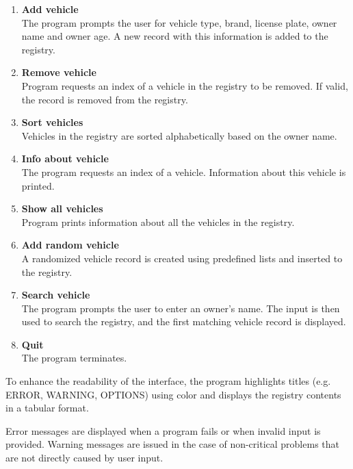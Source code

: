 \documentclass[12pt, a4paper]{article}
\begin{document}
\begin{enumerate}
  \item \textbf{Add vehicle} \\
  The program prompts the user for vehicle type, brand, license plate, owner name and owner age. A new record with this information is added to the registry.

  \item \textbf{Remove vehicle} \\
  Program requests an index of a vehicle in the registry to be removed. If valid, the record is removed from the registry.

  \item \textbf{Sort vehicles} \\
  Vehicles in the registry are sorted alphabetically based on the owner name.

  \item \textbf{Info about vehicle} \\
  The program requests an index of a vehicle. Information about this vehicle is printed.

  \item \textbf{Show all vehicles} \\
  Program prints information about all the vehicles in the registry.

  \item \textbf{Add random vehicle} \\
  A randomized vehicle record is created using predefined lists and inserted to the registry.

  \item \textbf{Search vehicle} \\
    The program prompts the user to enter an owner's name. The input is then used to search the registry, and the first matching vehicle record is displayed.

  \item \textbf{Quit} \\
  The program terminates.
\end{enumerate}

To enhance the readability of the interface, the program highlights titles (e.g. ERROR, WARNING, OPTIONS) using color and displays the registry contents in a tabular format. 

Error messages are displayed when a program fails or when invalid input is provided. Warning messages are issued in the case of non-critical problems that are not directly caused by user input.
\end{document}
